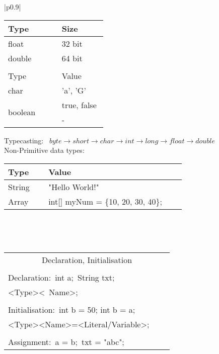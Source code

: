 \documentclass[a4paper, 8pt]{extarticle}
\begin{document}
\begin{minipage}[t]{0.25\linewidth}
\begin{tabular}{|p{0.9\linewidth}|}
\begin{tabular}[t]{p{0.20\linewidth} p{0.19\linewidth}}
Type & Size
\\\hline
float & 32 bit\\
double & 64 bit\\
\\[-7pt]
Type & Value\\\hline
char & 'a', 'G'\\
\multirow{2}{*}{boolean} & true, false\\
void & -
\end {tabular}
Typecasting:
\ $byte\rightarrow short\rightarrow char\rightarrow int\rightarrow long\rightarrow float\rightarrow double $
\\[110pt]
Non-Primitive data types:
\\[3pt]
\begin{tabular}[t]{p{0.15\linewidth} p{0.55\linewidth}}
Type & Value
\\\hline
String & "Hello World!"
\\
\multirow{2}{*}{Array} & int[] myNum = \{10, 20, 30, 40\};
\\
\end {tabular}
\\[8pt]\hline
\end{tabular}
\\[3pt]
\begin{tabular}{|p{0.9\linewidth}|}

\multicolumn{1}{|c|}{\cellcolor{headcol}\color{white}Declaration, Initialisation}\\
\\[-7pt]
Declaration:\ int a;\ String txt;\\
\footnotesize\textless Type\textgreater \textless \ Name\textgreater;
\\
\\[-7pt]
Initialisation:\ int b = 50; int b = a; \\
\footnotesize \textless Type\textgreater\textless Name\textgreater =\textless Literal/Variable\textgreater ;\\
\\[-7pt]
Assignment:\ a = b;\ txt = "abc";
\\[3pt]\hline
\end{tabular}
\\[3pt]


\end{minipage}
\end{document}
